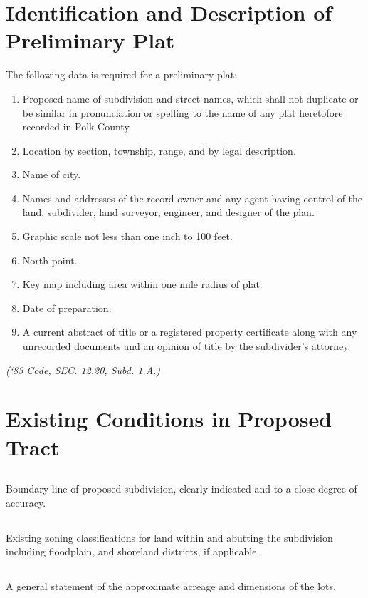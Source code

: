 \section{Identification and Description of Preliminary Plat}
The following data is required for a preliminary plat:
\begin{enumerate}[{\indent}A)]
    \item Proposed name of subdivision and street names, which shall not duplicate or be similar in pronunciation or spelling to the name of any plat heretofore recorded in Polk County.
    \item Location by section, township, range, and by legal description.
    \item Name of city.
    \item Names and addresses of the record owner and any agent having control of the land, subdivider, land surveyor, engineer, and designer of the plan.
    \item Graphic scale not less than one inch to 100 feet.
    \item North point.
    \item Key map including area within one mile radius of plat.
    \item Date of preparation.
    \item A current abstract of title or a registered property certificate along with any unrecorded documents and an opinion of title by the subdivider’s attorney.
\end{enumerate}
\emph{(‘83 Code, SEC. 12.20, Subd. 1.A.)}
\section{Existing Conditions in Proposed Tract}
\subsection{}
Boundary line of proposed subdivision, clearly indicated and to a close degree of accuracy.
\subsection{}
Existing zoning classifications for land within and abutting the subdivision including floodplain, and shoreland districts, if applicable.
\subsection{}
A general statement of the approximate acreage and dimensions of the lots.
